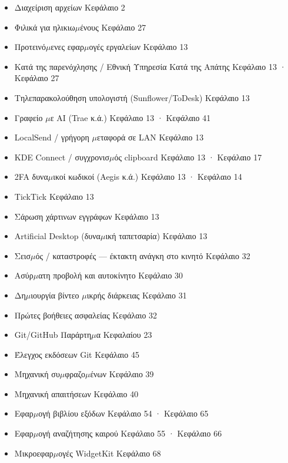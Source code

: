\begin{itemize}
  \item Διαχείριση αρχείων Κεφάλαιο 2
  \item Φιλικά για ηλικιω$\mu$ένους Κεφάλαιο 27
  \item Προτεινό$\mu$ενες εφαρ$\mu$ογές εργαλείων Κεφάλαιο 13
  \item Κατά της παρενόχλησης / Εθνική Υπηρεσία Κατά της Απάτης Κεφάλαιο 13 · Κεφάλαιο 27
  \item Τηλεπαρακολούθηση υπολογιστή (Sunflower/ToDesk) Κεφάλαιο 13
  \item Γραφείο $\mu$ε AI (Trae κ.ά.) Κεφάλαιο 13 · Κεφάλαιο 41
  \item LocalSend / γρήγορη $\mu$εταφορά σε LAN Κεφάλαιο 13
  \item KDE Connect / συγχρονισ$\mu$ός clipboard Κεφάλαιο 13 · Κεφάλαιο 17
  \item 2FA δυνα$\mu$ικοί κωδικοί (Aegis κ.ά.) Κεφάλαιο 13 · Κεφάλαιο 14
  \item TickTick Κεφάλαιο 13
  \item Σάρωση χάρτινων εγγράφων Κεφάλαιο 13
  \item Artificial Desktop (δυνα$\mu$ική ταπετσαρία) Κεφάλαιο 13
  \item Σεισ$\mu$ός / καταστροφές — έκτακτη ανάγκη στο κινητό Κεφάλαιο 32
  \item Ασύρ$\mu$ατη προβολή και αυτοκίνητο Κεφάλαιο 30
  \item Δη$\mu$ιουργία βίντεο $\mu$ικρής διάρκειας Κεφάλαιο 31
  \item Πρώτες βοήθειες ασφαλείας Κεφάλαιο 32
  \item Git/GitHub Παράρτη$\mu$α Κεφαλαίου 23
  \item Έλεγχος εκδόσεων Git Κεφάλαιο 45
  \item Μηχανική συ$\mu$φραζο$\mu$ένων Κεφάλαιο 39
  \item Μηχανική απαιτήσεων Κεφάλαιο 40
  \item Εφαρ$\mu$ογή βιβλίου εξόδων Κεφάλαιο 54 · Κεφάλαιο 65
  \item Εφαρ$\mu$ογή αναζήτησης καιρού Κεφάλαιο 55 · Κεφάλαιο 66
  \item Μικροεφαρ$\mu$ογές WidgetKit Κεφάλαιο 68
\end{itemize}

